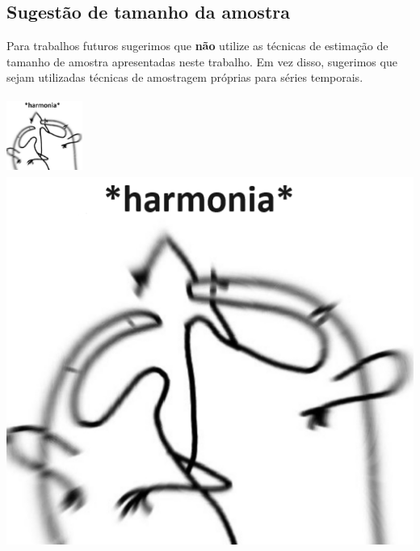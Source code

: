 \documentclass[
]{article}
\let\oldincludegraphics\includegraphics
\renewcommand{\includegraphics}[2][]{ \ifthenelse{ \equal{#1}{} } { \oldincludegraphics[width=2.5cm,height=2.5cm,keepaspectratio=true]{#2} } { \oldincludegraphics[#1]{#2} } }
\begin{document}
\subsection{Sugestão de tamanho da
amostra}\label{sugestuxe3o-de-tamanho-da-amostra}

Para trabalhos futuros sugerimos que \textbf{não} utilize as técnicas de
estimação de tamanho de amostra apresentadas neste trabalho. Em vez
disso, sugerimos que sejam utilizadas técnicas de amostragem próprias
para séries temporais.

\includegraphics{./images/flork-harmonia.png}
\end{document}
